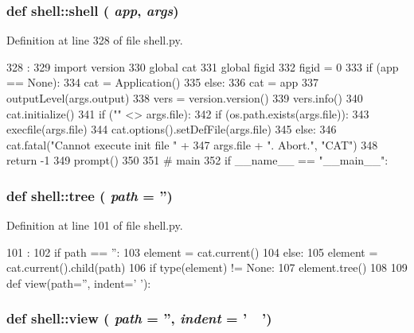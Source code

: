 \hypertarget{namespaceshell_a9d638bc42cd48d04c808504ae4a0e057}{
\subsubsection[{shell}]{\setlength{\rightskip}{0pt plus 5cm}def shell::shell ( {\em app}, \/   {\em args})}}
\label{namespaceshell_a9d638bc42cd48d04c808504ae4a0e057}


Definition at line 328 of file shell.py.


\begin{DoxyCode}
328                     :
329   import version
330   global cat
331   global figid
332   figid = 0
333   if (app == None):
334     cat = Application()
335   else:
336     cat = app
337   outputLevel(args.output)
338   vers = version.version()
339   vers.info()
340   cat.initialize()
341   if ("" <> args.file):
342     if (os.path.exists(args.file)):
343       execfile(args.file)
344       cat.options().setDefFile(args.file)
345     else:
346       cat.fatal("Cannot execute init file " +
347                 args.file + ". Abort.", "CAT")
348       return -1
349   prompt()
350 
351 # main
352 
if __name__ == "__main__":
\end{DoxyCode}
\hypertarget{namespaceshell_aa529082bccc6880160c24f417d8d4868}{
\subsubsection[{tree}]{\setlength{\rightskip}{0pt plus 5cm}def shell::tree ( {\em path} = {\ttfamily ''})}}
\label{namespaceshell_aa529082bccc6880160c24f417d8d4868}


Definition at line 101 of file shell.py.


\begin{DoxyCode}
101                  :
102   if path == '':
103     element = cat.current()
104   else:
105     element = cat.current().child(path)
106   if type(element) != None:
107     element.tree()
108 
109 
def view(path='', indent='  '):
\end{DoxyCode}
\hypertarget{namespaceshell_a08095b8594376efea24bd0f8b8bc5c07}{
\subsubsection[{view}]{\setlength{\rightskip}{0pt plus 5cm}def shell::view ( {\em path} = {\ttfamily ''}, \/   {\em indent} = {\ttfamily '~~'})}}
\label{namespaceshell_a08095b8594376efea24bd0f8b8bc5c07}


